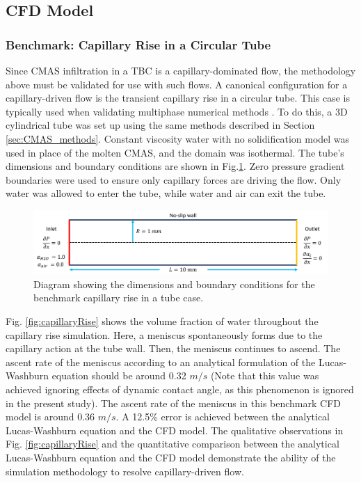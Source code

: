 \documentclass{UCF_ETD}
\begin{document}
\subsection{CFD Model}
\subsubsection{Benchmark: Capillary Rise in a Circular Tube}

Since CMAS infiltration in a TBC is a capillary-dominated flow, the methodology above must be validated for use with such flows.
A canonical configuration for a capillary-driven flow is the transient capillary rise in a circular tube.
This case is typically used when validating multiphase numerical methods \cite{GRUNDING2020142, Shiri2022}. 
To do this, a 3D cylindrical tube was set up using the same methods described in Section \ref{sec:CMAS_methods}.
Constant viscosity water with no solidification model was used in place of the molten CMAS, and the domain was isothermal.
The tube's dimensions and boundary conditions are shown in Fig.\ref{fig:benchmark_diagram}. Zero pressure gradient boundaries were used to ensure only capillary forces are driving the flow. Only water was allowed to enter the tube, while water and air can exit the tube.

\begin{figure}
    \centering
    \includegraphics[width=\linewidth]{Figures/capillaryRiseDiagram.png}
    \caption{Diagram showing the dimensions and boundary conditions for the benchmark capillary rise in a tube case.}
    \label{fig:benchmark_diagram}
\end{figure}

Fig. \ref{fig:capillaryRise} shows the volume fraction of water throughout the capillary rise simulation. Here, a meniscus spontaneously forms due to the capillary action at the tube wall. Then, the meniscus continues to ascend. The ascent rate of the meniscus according to an analytical formulation of the Lucas-Washburn equation \cite{HAMRAOUI2002415} should be around 0.32 $m/s$  (Note that this value was achieved ignoring effects of dynamic contact angle, as this phenomenon is ignored in the present study). The ascent rate of the meniscus in this benchmark CFD model is around 0.36 $m/s$. A 12.5\% error is achieved between the analytical Lucas-Washburn equation and the CFD model. The qualitative observations in Fig. \ref{fig:capillaryRise} and the quantitative comparison between the analytical Lucas-Washburn equation and the CFD model demonstrate the ability of the simulation methodology to resolve capillary-driven flow. 
\end{document}
